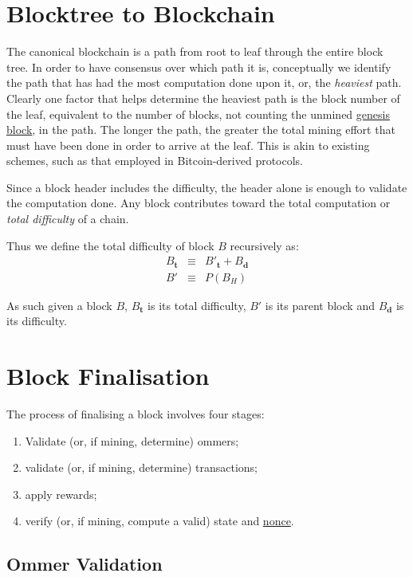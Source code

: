 \documentclass[9pt,oneside]{amsart}
\begin{document}
\begin{multicols}{2}
\section{Blocktree to Blockchain} \label{ch:ghost}

The canonical blockchain is a path from root to leaf through the entire block tree. In order to have consensus over which path it is, conceptually we identify the path that has had the most computation done upon it, or, the \textit{heaviest} path. Clearly one factor that helps determine the heaviest path is the block number of the leaf, equivalent to the number of blocks, not counting the unmined \hyperlink{GenesisBlock}{genesis block}, in the path. The longer the path, the greater the total mining effort that must have been done in order to arrive at the leaf. This is akin to existing schemes, such as that employed in Bitcoin-derived protocols.

Since a block header includes the difficulty, the header alone is enough to validate the computation done. Any block contributes toward the total computation or \textit{total difficulty} of a chain.

Thus we define the total difficulty of block $B$ recursively as:
\begin{eqnarray}
B_\mathbf{t} & \equiv & B'_\mathbf{t} + B_\mathbf{d} \\
B' & \equiv & P(B_H)
\end{eqnarray}

As such given a block $B$, $B_\mathbf{t}$ is its total difficulty, $B'$ is its parent block and $B_\mathbf{d}$ is its difficulty.

\section{Block Finalisation} \label{ch:finalisation}

The process of finalising a block involves four stages:

\begin{enumerate}
\item Validate (or, if mining, determine) ommers;
\item validate (or, if mining, determine) transactions;
\item apply rewards;
\item verify (or, if mining, compute a valid) state and \hyperlink{block nonce}{nonce}.
\end{enumerate}

\subsection{Ommer Validation}


\end{multicols}
\end{document}
